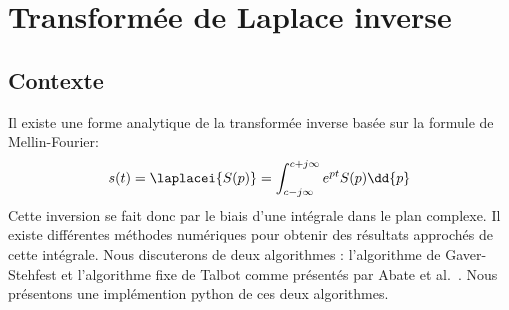 \chapter{Transformée de Laplace inverse~\label{annexe-invL}}

\section{Contexte}
Il existe une forme analytique de la transformée inverse basée sur
la formule de Mellin-Fourier\cite{Ostertag}:
\[
s(t)=\laplacei{S(p)}=\int_{c-j\infty}^{c+j\infty} e^{pt}S(p)\dd{p}
\]
Cette inversion se fait donc par le biais d'une intégrale dans le plan
complexe. Il existe différentes méthodes numériques pour obtenir des résultats
approchés de cette intégrale. Nous discuterons de deux algorithmes : 
l'algorithme de Gaver-Stehfest et l'algorithme fixe de Talbot comme présentés
par Abate et al.~\cite{abate2004,abate2006,frwiki:200676411}.
Nous présentons une implémention python de ces deux algorithmes.
